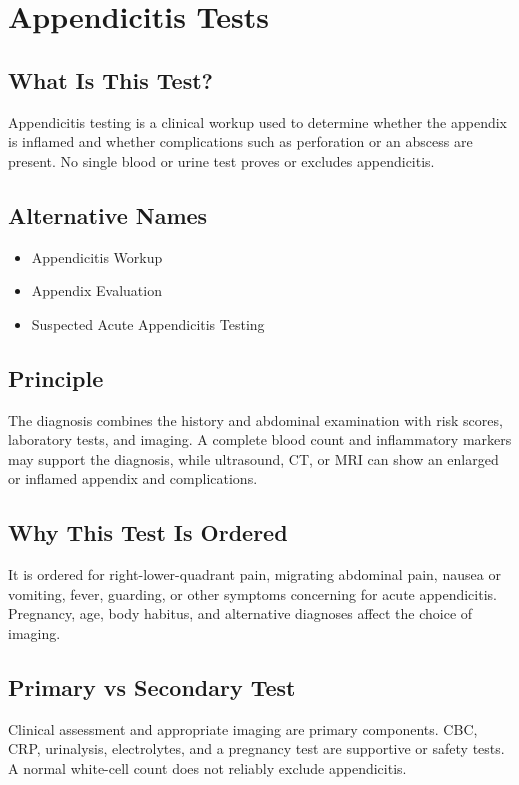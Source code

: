 \chapter{Appendicitis Tests}

\section*{What Is This Test?}
Appendicitis testing is a clinical workup used to determine whether the appendix is inflamed and whether complications such as perforation or an abscess are present. No single blood or urine test proves or excludes appendicitis.

\section*{Alternative Names}
\begin{itemize}
  \item Appendicitis Workup
  \item Appendix Evaluation
  \item Suspected Acute Appendicitis Testing
\end{itemize}

\section*{Principle}
The diagnosis combines the history and abdominal examination with risk scores, laboratory tests, and imaging. A complete blood count and inflammatory markers may support the diagnosis, while ultrasound, CT, or MRI can show an enlarged or inflamed appendix and complications.

\section*{Why This Test Is Ordered}
It is ordered for right-lower-quadrant pain, migrating abdominal pain, nausea or vomiting, fever, guarding, or other symptoms concerning for acute appendicitis. Pregnancy, age, body habitus, and alternative diagnoses affect the choice of imaging.

\section*{Primary vs Secondary Test}
Clinical assessment and appropriate imaging are primary components. CBC, CRP, urinalysis, electrolytes, and a pregnancy test are supportive or safety tests. A normal white-cell count does not reliably exclude appendicitis.

